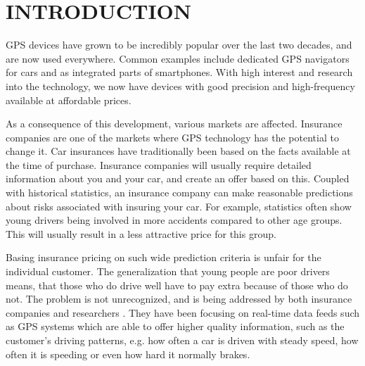 \section{INTRODUCTION}
\label{sec:intro}

GPS devices have grown to be incredibly popular over the last two decades, and are now used everywhere. Common examples include dedicated GPS navigators for cars and as integrated parts of smartphones. With high interest and research into the technology, we now have devices with good precision and high-frequency available at affordable prices\cite{art:telematicsmatter}.

As a consequence of this development, various markets are affected. Insurance companies are one of the markets where GPS technology has the potential to change it. Car insurances have traditionally been based on the facts available at the time of purchase. Insurance companies will usually require detailed information about you and your car, and create an offer based on this. Coupled with historical statistics, an insurance company can make reasonable predictions about risks associated with insuring your car. For example, statistics often show young drivers being involved in more accidents compared to other age groups\cite{accidents}\cite{url:forbes}. This will usually result in a less attractive price for this group.

Basing insurance pricing on such wide prediction criteria is unfair for the individual customer. The generalization that young people are poor drivers means, that those who do drive well have to pay extra because of those who do not. The problem is not unrecognized, and is being addressed by both insurance companies and researchers \cite{mar:ubi16}. They have been focusing on real-time data feeds such as GPS systems which are able to offer higher quality information, such as the customer's driving patterns, e.g. how often a car is driven with steady speed, how often it is speeding or even how hard it normally brakes.
%

